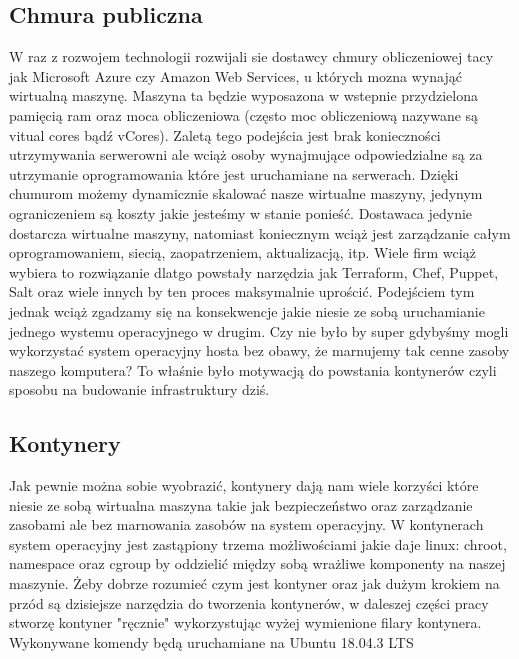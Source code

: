 \subsection{Chmura publiczna}
W raz z rozwojem technologii rozwijali sie dostawcy chmury obliczeniowej tacy jak Microsoft Azure czy Amazon Web Services, u których mozna wynająć wirtualną maszynę. Maszyna ta będzie wyposazona w wstepnie przydzielona pamięcią ram oraz moca obliczeniowa (często moc obliczeniową nazywane są vitual cores bądź vCores). 
Zaletą tego podejścia jest brak konieczności utrzymywania serwerowni ale wciąż osoby wynajmujące odpowiedzialne są za utrzymanie oprogramowania które jest uruchamiane na serwerach. 
Dzięki chumurom możemy dynamicznie skalować nasze wirtualne maszyny, jedynym ograniczeniem są koszty jakie jesteśmy w stanie ponieść. Dostawaca jedynie dostarcza wirtualne maszyny, natomiast koniecznym wciąż jest zarządzanie całym oprogramowaniem, siecią, zaopatrzeniem, aktualizacją, itp. Wiele firm wciąż wybiera to rozwiązanie dlatgo powstały narzędzia jak Terraform, Chef, Puppet, Salt oraz wiele innych by ten proces maksymalnie uprościć. 
Podejściem tym jednak wciąż zgadzamy się na konsekwencje jakie niesie ze sobą uruchamianie jednego wystemu operacyjnego w drugim. Czy nie było by super gdybyśmy mogli wykorzystać system operacyjny hosta bez obawy, że marnujemy tak cenne zasoby naszego komputera? To właśnie było motywacją do powstania kontynerów czyli sposobu na budowanie infrastruktury dziś. 
\subsection{Kontynery}
Jak pewnie można sobie wyobrazić, kontynery dają nam wiele korzyści które niesie ze sobą wirtualna maszyna takie jak bezpieczeństwo oraz zarządzanie zasobami ale bez marnowania zasobów na system operacyjny. W kontynerach system operacyjny jest zastąpiony trzema możliwościami jakie daje linux: chroot, namespace oraz cgroup by oddzielić między sobą wrażliwe komponenty na naszej maszynie.
Żeby dobrze rozumieć czym jest kontyner oraz jak dużym krokiem na przód są dzisiejsze narzędzia do tworzenia kontynerów, w daleszej części pracy stworzę kontyner "ręcznie" wykorzystując wyżej wymienione filary kontynera. Wykonywane komendy będą uruchamiane na Ubuntu 18.04.3 LTS


